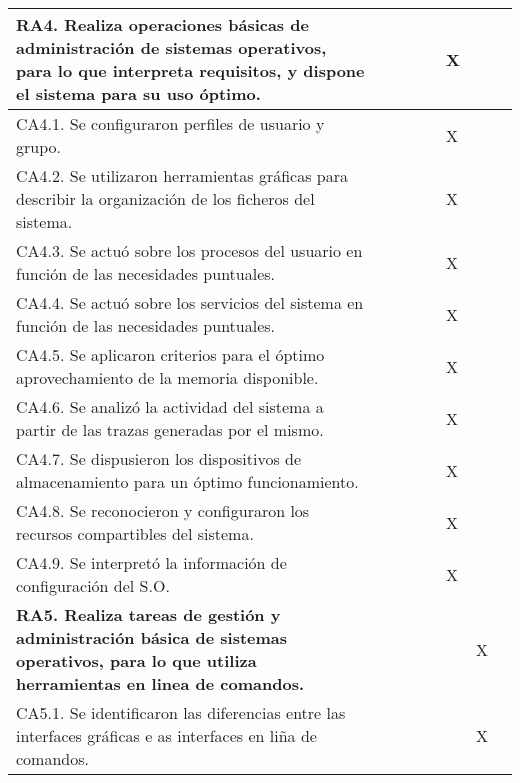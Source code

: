 \documentclass[a4paper,oneside,titlepage,12pt]{article}
\begin{document}
\begin{tabularx}{\textwidth}{| X | M{0.5cm} | M{0.5cm} | M{0.5cm} | M{0.5cm} | M{0.5cm} | M{0.5cm} | m{5cm} |}
    \textbf{RA4. Realiza operaciones básicas de administración de sistemas operativos, para lo que interpreta requisitos, y dispone el sistema para su uso óptimo.} &  &  &  &  & X &  & \\\hline
    
    \quad CA4.1. Se configuraron perfiles de usuario y grupo. &  &  &  &  & X &  & \\\hline
    
    \quad CA4.2. Se utilizaron herramientas gráficas para describir la organización de los ficheros del sistema. &  &  &  &  & X &  & \\\hline
    
    \quad CA4.3. Se actuó sobre los procesos del usuario en función de las necesidades puntuales. &  &  &  &  & X &  & \\\hline
    
    \quad CA4.4. Se actuó sobre los servicios del sistema en función de las necesidades puntuales. &  &  &  &  & X &  & \\\hline
    
    \quad CA4.5. Se aplicaron criterios para el óptimo aprovechamiento de la memoria disponible. &  &  &  &  & X &  & \\\hline
    
    \quad CA4.6. Se analizó la actividad del sistema a partir de las trazas generadas por el mismo. &  &  &  &  & X &  & \\\hline
    
    \quad CA4.7. Se dispusieron los dispositivos de almacenamiento para un óptimo funcionamiento. &  &  &  &  & X &  & \\\hline
    
    \quad CA4.8. Se reconocieron y configuraron los recursos compartibles del sistema. &  &  &  &  & X &  & \\\hline
    
    \quad CA4.9. Se interpretó la información de configuración del S.O. &  &  &  &  & X &  & \\\hline
    
    \textbf{RA5. Realiza tareas de gestión y administración básica de sistemas operativos, para lo que utiliza herramientas en linea de comandos.} &  &  &  &  &  & X & \\\hline
    
    \quad CA5.1. Se identificaron las diferencias entre las interfaces gráficas e as interfaces en liña de comandos. &  &  &  &  &  & X & \\\hline
    

\end{tabularx}
\end{document}
